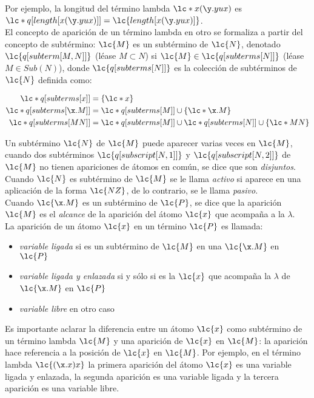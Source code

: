 Por ejemplo, la longitud del término lambda \(\lc*{x(\y.y u x)}\) es
\(\lc*{q[length[x(\y.y u x)]]}=\lc{length[x(\y.y u x)]}\). \\

El concepto de aparición de un término lambda en otro se formaliza a partir del
concepto de subtérmino: \(\lc{M}\) es un subtérmino de \(\lc{N}\), denotado
\(\lc{q[subterm[M,N]]}\) (léase \(M \subset N\)) si \(\lc{M} \in
\lc{q[subterms[N]]}\) (léase \(M \in Sub(N)\)), donde \(\lc{q[subterms[N]]}\) es
la colección de subtérminos de \(\lc{N}\) definida como:

\begin{align*}
  \lc*{q[subterms[x]]} &= \{\lc*{x}\} \\
  \lc*{q[subterms[\x.M]]} &= \lc*{q[subterms[M]]} \cup \{\lc*{\x.M}\} \\
  \lc*{q[subterms[M N]]} &= \lc*{q[subterms[M]]} \cup \lc*{q[subterms[N]]} \cup \{\lc*{M N}\}
\end{align*}

Un subtérmino \(\lc{N}\) de \(\lc{M}\) puede aparecer varias veces en
\(\lc{M}\), cuando dos subtérminos \(\lc{q[subscript[N,1]]}\) y
\(\lc{q[subscript[N,2]]}\) de \(\lc{M}\) no tienen apariciones de átomos en
común, se dice que son \emph{disjuntos}. Cuando \(\lc{N}\) es subtérmino de
\(\lc{M}\) se le llama \emph{activo} si aparece en una aplicación de la forma
\(\lc{N Z}\), de lo contrario, se le llama \emph{pasivo}. \\

Cuando \(\lc{\x.M}\) es un subtérmino de \(\lc{P}\), se dice que la aparición
\(\lc{M}\) es el \emph{alcance} de la aparición del átomo \(\lc{x}\) que
acompaña a la \(\lambda\). \\

La aparición de un átomo \(\lc{x}\) en un término \(\lc{P}\) es llamada:

\begin{itemize}
\item \emph{variable ligada} si es un subtérmino de \(\lc{M}\) en una
  \(\lc{\x.M}\) en \(\lc{P}\)
\item \emph{variable ligada y enlazada} si y sólo si es la \(\lc{x}\) que
  acompaña la \(\lambda\) de \(\lc{\x.M}\) en \(\lc{P}\)
\item \emph{variable libre} en otro caso
\end{itemize}

Es importante aclarar la diferencia entre un átomo \(\lc{x}\) como subtérmino de un término
lambda \(\lc{M}\) y una aparición de \(\lc{x}\) en \(\lc{M}\): la aparición hace
referencia a la posición de \(\lc{x}\) en \(\lc{M}\). Por ejemplo, en el término
lambda \(\lc{(\x.x)x}\) la primera aparición del átomo \(\lc{x}\) es una
variable ligada y enlazada, la segunda aparición es una variable ligada y la
tercera aparición es una variable libre. \\

